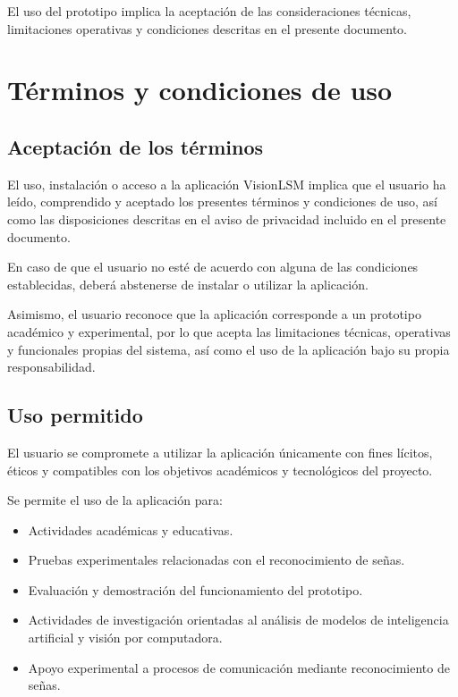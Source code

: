 	El uso del prototipo implica la aceptación de las consideraciones técnicas, limitaciones operativas y condiciones descritas en el presente documento.

	

	\section{Términos y condiciones de uso}
	
	\subsection{Aceptación de los términos}
	
	El uso, instalación o acceso a la aplicación VisionLSM implica que el usuario ha leído, comprendido y aceptado los presentes términos y condiciones de uso, así como las disposiciones descritas en el aviso de privacidad incluido en el presente documento.
	
	En caso de que el usuario no esté de acuerdo con alguna de las condiciones establecidas, deberá abstenerse de instalar o utilizar la aplicación.
	
	Asimismo, el usuario reconoce que la aplicación corresponde a un prototipo académico y experimental, por lo que acepta las limitaciones técnicas, operativas y funcionales propias del sistema, así como el uso de la aplicación bajo su propia responsabilidad.
	
	\subsection{Uso permitido}
	
	El usuario se compromete a utilizar la aplicación únicamente con fines lícitos, éticos y compatibles con los objetivos académicos y tecnológicos del proyecto.
	
	Se permite el uso de la aplicación para:
	
	\begin{itemize}
		\item Actividades académicas y educativas.
		
		\item Pruebas experimentales relacionadas con el reconocimiento de señas.
		
		\item Evaluación y demostración del funcionamiento del prototipo.
		
		\item Actividades de investigación orientadas al análisis de modelos de inteligencia artificial y visión por computadora.
		
		\item Apoyo experimental a procesos de comunicación mediante reconocimiento de señas.
	\end{itemize}
	
